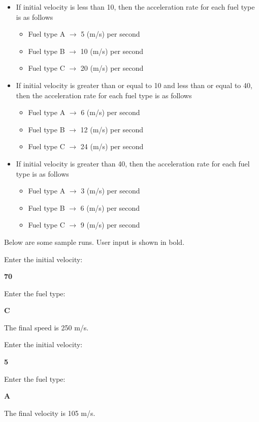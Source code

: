 \begin{itemize}
    \item If initial velocity is less than 10, then the acceleration rate for each fuel type is as follows
    \begin{itemize}
        \item Fuel type A $\rightarrow$ 5 (m/s) per second
        \item Fuel type B $\rightarrow$ 10 (m/s) per second
        \item Fuel type C $\rightarrow$ 20 (m/s) per second
    \end{itemize}
   \item If initial velocity is greater than or equal to 10 and less than or equal to 40, then the acceleration rate
   for each fuel type is as follows
   \begin{itemize}
        \item Fuel type A $\rightarrow$ 6 (m/s) per second
        \item Fuel type B $\rightarrow$ 12 (m/s) per second
        \item Fuel type C $\rightarrow$ 24 (m/s) per second
   \end{itemize}
    \item If initial velocity is greater than 40, then the acceleration rate for each fuel type is as follows
    \begin{itemize}
        \item Fuel type A $\rightarrow$ 3 (m/s) per second
        \item Fuel type B $\rightarrow$ 6 (m/s) per second
        \item Fuel type C $\rightarrow$ 9 (m/s) per second 
    \end{itemize}
\end{itemize}

Below are some sample runs. User input is shown in bold. 

\begin{sample}
    Enter the initial velocity:
    
    \textbf{70}
    
    Enter the fuel type:
    
    \textbf{C}
    
    The final speed is 250 m/s.
\end{sample}

\begin{sample}
    Enter the initial velocity:
    
    \textbf{5}
    
    Enter the fuel type:
    
    \textbf{A}
    
    The final velocity is 105 m/s.
\end{sample}

